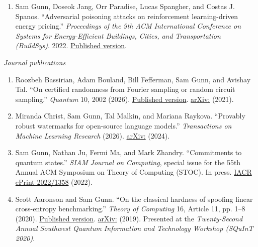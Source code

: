 \documentclass[line,margin]{res}
\begin{document}
\begin{resume}
\begin{enumerate}
\item Sam Gunn, Doseok Jang, Orr Paradise, Lucas Spangher, and Costas J. Spanos. ``Adversarial poisoning attacks on reinforcement learning-driven energy pricing.'' \emph{Proceedings of the 9th ACM International Conference on Systems for Energy-Efficient Buildings, Cities, and Transportation (BuildSys)}. 2022. \href{https://doi.org/10.1145/3563357.3564075}{Published version}.

\end{enumerate}

\emph{Journal publications}
\begin{enumerate}
\item Roozbeh Bassirian, Adam Bouland, Bill Fefferman, Sam Gunn, and Avishay Tal. ``On certified randomness from Fourier sampling or random circuit sampling.'' \emph{Quantum} 10, 2002 (2026). \href{https://doi.org/10.22331/q-2026-02-10-2002}{Published version}. \href{https://arxiv.org/abs/2111.14846}{arXiv:} (2021).

\item Miranda Christ, Sam Gunn, Tal Malkin, and Mariana Raykova. ``Provably robust watermarks for open-source language models.'' \emph{Transactions on Machine Learning Research} (2026). \href{https://arxiv.org/abs/2410.18861}{arXiv:} (2024).

\item Sam Gunn, Nathan Ju, Fermi Ma, and Mark Zhandry. ``Commitments to quantum states.'' \emph{SIAM Journal on Computing}, special issue for the 55th Annual ACM Symposium on Theory of Computing (STOC). In press. \href{https://eprint.iacr.org/2022/1358}{IACR ePrint 2022/1358} (2022).

\item Scott Aaronson and Sam Gunn. ``On the classical hardness of spoofing linear cross-entropy benchmarking.'' \emph{Theory of Computing} 16, Article 11, pp. 1--8 (2020). \href{https://theoryofcomputing.org/articles/v016a011/}{Published version}. \href{https://arxiv.org/abs/1910.12085}{arXiv:} (2019). Presented at the \emph{Twenty-Second Annual Southwest Quantum Information and Technology Workshop (SQuInT 2020)}.
\end{enumerate}


\end{resume}
\end{document}
